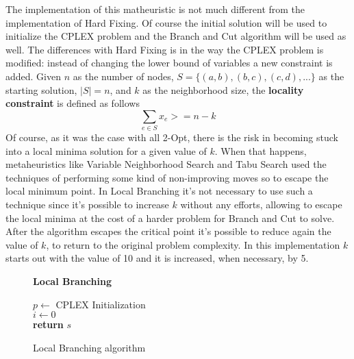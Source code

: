 The implementation of this matheuristic is not much different from the implementation of Hard Fixing.
Of course the initial solution will be used to initialize the CPLEX problem and the Branch and Cut algorithm will be used as well.
The differences with Hard Fixing is in the way the CPLEX problem is modified: instead of changing the lower bound of variables a new constraint is added.
Given $n$ as the number of nodes, $S = \{(a,b),(b,c),(c,d),...\}$ as the starting solution, $|S| = n$, and $k$ as the neighborhood size, the \textbf{locality constraint} is defined as follows
\[
    \sum_{e \in S} x_e >= n-k
\]
Of course, as it was the case with all 2-Opt, there is the risk in becoming stuck into a local minima solution for a given value of $k$.
When that happens, metaheuristics like Variable Neighborhood Search and Tabu Search used the techniques of performing some kind of non-improving moves so to escape the local minimum point.
In Local Branching it's not necessary to use such a technique since it's possible to increase $k$ without any efforts, allowing to escape the local minima at the cost of a harder problem for Branch and Cut to solve.
After the algorithm escapes the critical point it's possible to reduce again the value of $k$, to return to the original problem complexity.
In this implementation $k$ starts out with the value of 10 and it is increased, when necessary, by 5.

\begin{figure}[htbp]
	\textbf{Local Branching} \\
	\begin{algorithm}[H]
		\vspace{2mm}
        $p \gets$ CPLEX Initialization \\
        $i \gets 0$ \\ 
        \textbf{return} $s$
	\end{algorithm}
	\caption{Local Branching algorithm} \label{fig:localBranching}
\end{figure}

